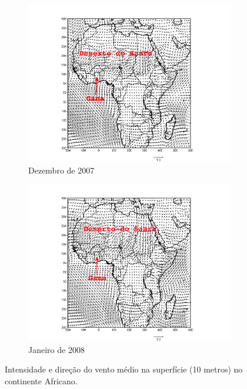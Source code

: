 \begin{figure}[H]
  \centering
  \begin{subfigure}[b]{0.5\linewidth}
    \includegraphics[width=\linewidth]{../inputs/grads/gimp/1000hPa/DEZ_2007.pdf}
    \caption{Dezembro de 2007}
  \end{subfigure}%
  \begin{subfigure}[b]{0.5\linewidth}
    \includegraphics[width=\linewidth]{../inputs/grads/gimp/1000hPa/JAN_2008.pdf}
    \caption{Janeiro de 2008}
  \end{subfigure}
  \caption{Intensidade e direção do vento médio na superfície (10 metros) no 
           continente Africano. \label{fig:ECMWF10} }
\end{figure}

